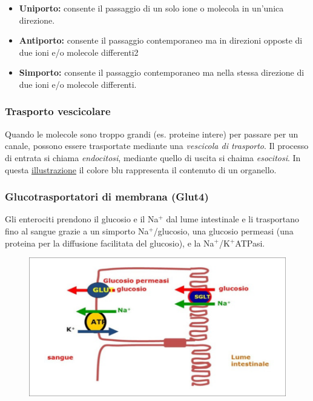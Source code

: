 \documentclass[a4paper]{article}
\begin{document}
\begin{itemize}
    \item \textbf{Uniporto:} consente il passaggio di un solo ione o molecola in un'unica direzione.
    \item \textbf{Antiporto:} consente il passaggio contemporaneo ma in direzioni opposte di due ioni e/o molecole differenti2
    \item \textbf{Simporto:} consente il passaggio contemporaneo ma nella stessa direzione di due ioni e/o molecole differenti.
\end{itemize}

\subsubsection{Trasporto vescicolare}

Quando le molecole sono troppo grandi (es. proteine intere) per passare per un canale, possono essere trasportate 
mediante una \textit{vescicola di trasporto}. Il processo di entrata si chiama \textit{endocitosi},
mediante quello di uscita si chaima \textit{esocitosi}. 
In questa \href{https://youtu.be/uYpNUw7vPO4}{illustrazione} il colore blu rappresenta il contenuto di un organello.

\pagebreak

\subsubsection{Glucotrasportatori di membrana (Glut4)}

Gli enterociti prendono il glucosio e il Na\({}^+\) dal lume intestinale
e li trasportano fino al sangue grazie a un simporto Na\({}^+\)/glucosio, una glucosio permeasi
(una proteina per la diffusione facilitata del glucosio), e la Na\({}^+\)/K\({}^+\)ATPasi. 


\begin{figure}[h]
    \centering
    \includegraphics[width=\textwidth]{./glut4.png}
\end{figure}
\end{document}

